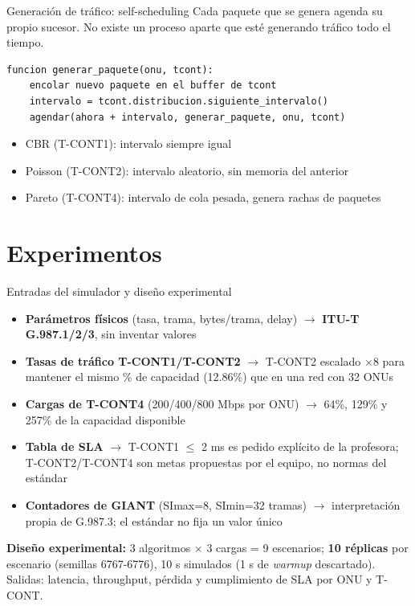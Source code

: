 \documentclass[aspectratio=169,t]{beamer}
\begin{document}
\begin{frame}[fragile]{Generación de tráfico: self-scheduling}
    Cada paquete que se genera agenda su propio sucesor. No existe un
    proceso aparte que esté generando tráfico todo el tiempo.

    \begin{lstlisting}[style=pseudo]
funcion generar_paquete(onu, tcont):
    encolar nuevo paquete en el buffer de tcont
    intervalo = tcont.distribucion.siguiente_intervalo()
    agendar(ahora + intervalo, generar_paquete, onu, tcont)
    \end{lstlisting}

    \footnotesize
    \begin{itemize}
        \item CBR (T-CONT1): intervalo siempre igual
        \item Poisson (T-CONT2): intervalo aleatorio, sin memoria del anterior
        \item Pareto (T-CONT4): intervalo de cola pesada, genera rachas de paquetes
    \end{itemize}
\end{frame}

\section{Experimentos}

\begin{frame}{Entradas del simulador y diseño experimental}
    \footnotesize
    \begin{itemize}
        \item \textbf{Parámetros físicos} (tasa, trama, bytes/trama,
              delay) $\rightarrow$ \textbf{ITU-T G.987.1/2/3}, sin
              inventar valores
        \item \textbf{Tasas de tráfico T-CONT1/T-CONT2} $\rightarrow$
              T-CONT2 escalado $\times 8$ para mantener el mismo \% de
              capacidad (12.86\%) que en una red con 32 ONUs
        \item \textbf{Cargas de T-CONT4} (200/400/800 Mbps por ONU)
              $\rightarrow$ 64\%, 129\% y 257\% de la capacidad disponible
        \item \textbf{Tabla de SLA} $\rightarrow$ T-CONT1 $\leq$ 2 ms es
              pedido explícito de la profesora; T-CONT2/T-CONT4 son metas
              propuestas por el equipo, no normas del estándar
        \item \textbf{Contadores de GIANT} (SImax=8, SImin=32 tramas)
              $\rightarrow$ interpretación propia de G.987.3; el estándar
              no fija un valor único
    \end{itemize}
    \vspace{0.15cm}
    \textbf{Diseño experimental:} 3 algoritmos $\times$ 3 cargas = 9 escenarios;
    \textbf{10 réplicas} por escenario (semillas 6767-6776), 10 s simulados
    (1 s de \textit{warmup} descartado). Salidas: latencia, throughput,
    pérdida y cumplimiento de SLA por ONU y T-CONT.
\end{frame}
\end{document}
